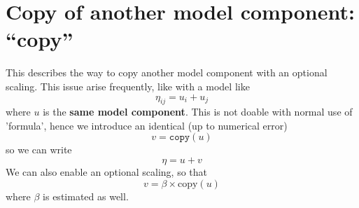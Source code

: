 \documentclass[a4paper,11pt]{article}
\begin{document}
\section*{Copy of another model component: ``copy''}

This describes the way to copy another model component with an
optional scaling. This issue arise frequently, like with a model like
\begin{displaymath}
    \eta_{ij} = u_i + u_j
\end{displaymath}
where $u$ is the \textbf{same model component}. This is not doable
with normal use of 'formula', hence we introduce an identical (up to
numerical error)
\begin{displaymath}
    v = \texttt{copy}(u)
\end{displaymath}
so we can write
\begin{displaymath}
    \eta = u + v
\end{displaymath}
We can also enable an optional scaling, so that
\begin{displaymath}
    v = \beta\times\text{copy}(u)
\end{displaymath}
where $\beta$ is estimated as well.
\end{document}
